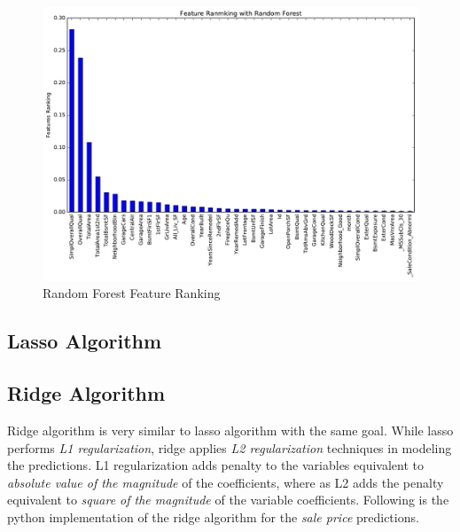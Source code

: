 \documentclass[sigconf]{acmart}
\begin{document}
	
	\begin{figure}[H]
		\centering
		\includegraphics[width=0.85\columnwidth]{images/random_forest_feature_ranking}	
		\caption{Random Forest Feature Ranking} \label{fig:random_feature_ranking} 
	\end{figure}
	
	\subsection{Lasso Algorithm}
	
	
	
	\subsection{Ridge Algorithm}
	
	Ridge algorithm is very similar to lasso algorithm with the same goal. While lasso performs {\em L1 regularization}, ridge applies {\em L2 regularization} techniques in modeling the predictions. L1 regularization adds penalty to the variables equivalent to {\em absolute value of the magnitude} of the coefficients, where as L2 adds the penalty equivalent to {\em square of the magnitude} of the variable coefficients. Following is the python implementation of the ridge algorithm for the {\em sale price} predictions. 
	
\end{document}
